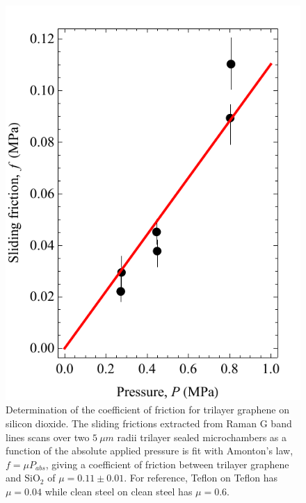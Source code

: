 \begin{figure}
	\begin{center}
	\includegraphics{Figs_Friction/Tri_mu.pdf}
	\end{center}
	\caption[Determination of the coefficient of friction for trilayer graphene on silicon dioxide]{\label{fig:fri:trimu} Determination of the coefficient of friction for trilayer graphene on silicon dioxide.  The sliding frictions extracted from Raman G band lines scans over two $5 \ \mu m$ radii trilayer sealed microchambers as a function of the absolute applied pressure is fit with Amonton's law, $f=\mu P_{abs}$, giving a coefficient of friction between trilayer graphene and $\mathrm{SiO_2}$ of $\mu=0.11 \pm 0.01$. For reference, Teflon on Teflon has $\mu=0.04$ while clean steel on clean steel has $\mu=0.6$\cite{Resnick2002}.}
\end{figure}

